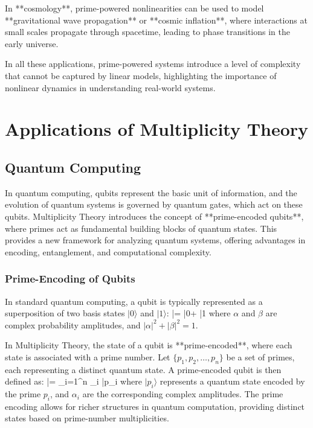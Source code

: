 \documentclass[12pt]{article}
\begin{document}
In **cosmology**, prime-powered nonlinearities can be used to model **gravitational wave propagation** or **cosmic inflation**, where interactions at small scales propagate through spacetime, leading to phase transitions in the early universe.

In all these applications, prime-powered systems introduce a level of complexity that cannot be captured by linear models, highlighting the importance of nonlinear dynamics in understanding real-world systems.


\section{Applications of Multiplicity Theory}

\subsection{Quantum Computing}

In quantum computing, qubits represent the basic unit of information, and the evolution of quantum systems is governed by quantum gates, which act on these qubits. Multiplicity Theory introduces the concept of **prime-encoded qubits**, where primes act as fundamental building blocks of quantum states. This provides a new framework for analyzing quantum systems, offering advantages in encoding, entanglement, and computational complexity.

\subsubsection{Prime-Encoding of Qubits}

In standard quantum computing, a qubit is typically represented as a superposition of two basis states \( |0\rangle \) and \( |1\rangle \):
\]
|\psi\rangle = \alpha |0\rangle + \beta |1\rangle
\]
where \( \alpha \) and \( \beta \) are complex probability amplitudes, and \( |\alpha|^2 + |\beta|^2 = 1 \). 

In Multiplicity Theory, the state of a qubit is **prime-encoded**, where each state is associated with a prime number. Let \( \{p_1, p_2, \dots, p_n\} \) be a set of primes, each representing a distinct quantum state. A prime-encoded qubit is then defined as:
\]
|\psi\rangle = \sum_{i=1}^{n} \alpha_i |p_i\rangle
\]
where \( |p_i\rangle \) represents a quantum state encoded by the prime \( p_i \), and \( \alpha_i \) are the corresponding complex amplitudes. The prime encoding allows for richer structures in quantum computation, providing distinct states based on prime-number multiplicities.
\end{document}
